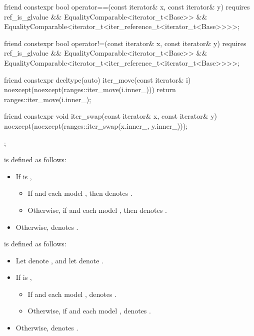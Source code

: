 \begin{codeblock}
{{    friend constexpr bool operator==(const iterator& x, const iterator& y)
      requires ref_is_glvalue && EqualityComparable<iterator_t<Base>> &&
               EqualityComparable<iterator_t<iter_reference_t<iterator_t<Base>>>>;

    friend constexpr bool operator!=(const iterator& x, const iterator& y)
      requires ref_is_glvalue && EqualityComparable<iterator_t<Base>> &&
               EqualityComparable<iterator_t<iter_reference_t<iterator_t<Base>>>>;

    friend constexpr decltype(auto) iter_move(const iterator& i)
    noexcept(noexcept(ranges::iter_move(i.inner_))) {
      return ranges::iter_move(i.inner_);
    }

    friend constexpr void iter_swap(const iterator& x, const iterator& y)
      noexcept(noexcept(ranges::iter_swap(x.inner_, y.inner_)));
  };
}
\end{codeblock}

\pnum
{} is defined as follows:
\begin{itemize}
\item If  is ,
  \begin{itemize}
  \item If  and  each model
    , then  denotes
    .
  \item Otherwise, if  and 
    each model , then  denotes
    .
  \end{itemize}
\item Otherwise,  denotes .
\end{itemize}

\pnum
{} is defined as follows:
\begin{itemize}
\item Let  denote
  , and
  let  denote
  .
\item If  is ,
  \begin{itemize}
  \item If  and  each model
    , 
    denotes .
  \item Otherwise, if  and  each model
    , 
    denotes .
  \end{itemize}
\item Otherwise,  denotes .
\end{itemize}

